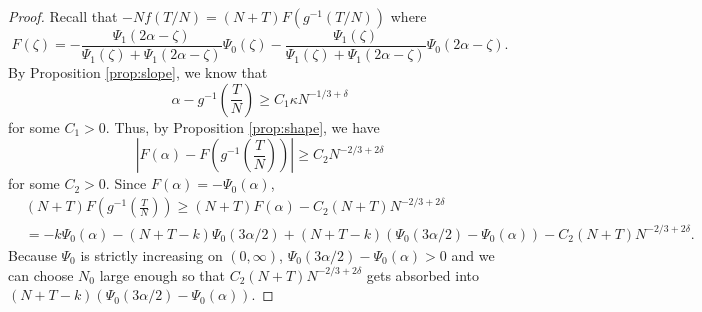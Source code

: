 \documentclass[11pt]{article}
\theoremstyle{definition}
\begin{document}
\begin{proof}

Recall that $-Nf(T/N) = (N+T)F(g^{-1}(T/N))$ where 
\[
F\left(\zeta \right) = -  \frac{\Psi_1(2\alpha - \zeta)}{\Psi_1(\zeta) + \Psi_1(2\alpha - \zeta)}\Psi_0(\zeta) - \frac{\Psi_1(\zeta)}{\Psi_1(\zeta) + \Psi_1(2\alpha-\zeta)}\Psi_0(2\alpha - \zeta).
\]
By Proposition \ref{prop:slope}, we know that
\[
\alpha- g^{-1}\left(\frac{T}{N}\right) \geq C_1\kappa N^{-1/3 + \delta}
\]
for some $C_1 > 0$. Thus, by Proposition \ref{prop:shape}, we have
\[
\left|F(\alpha) - F\left( g^{-1}\left(\frac{T}{N} \right)\right) \right| \geq C_2 N^{-2/3 + 2\delta}
\]
for some $C_2 > 0$. Since $F(\alpha) = -\Psi_0(\alpha)$,
\[
\begin{aligned}
&(N+T)F\left( g^{-1}\left(\frac{T}{N} \right)\right) \geq (N+T)F(\alpha) - C_2 (N+T) N^{-2/3 + 2\delta}\\
&= -k\Psi_0(\alpha) - (N+T-k)\Psi_0(3\alpha/2) +(N+T-k)(\Psi_0(3\alpha/2)-\Psi_0(\alpha))- C_2 (N+T) N^{-2/3 + 2\delta}.
\end{aligned}
\]
Because $\Psi_0$ is strictly increasing on $(0, \infty)$, $\Psi_0(3\alpha/2) - \Psi_0(\alpha) >0$ and we can choose $N_0$ large enough so that $C_2 (N+T) N^{-2/3 + 2\delta}$ gets absorbed into $(N+T-k)(\Psi_0(3\alpha/2)-\Psi_0(\alpha))$.

\end{proof}
\end{document}
